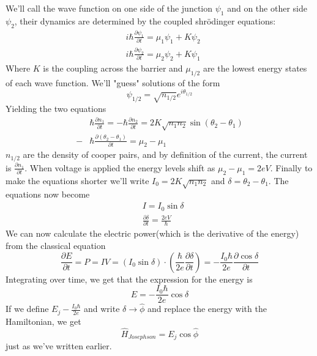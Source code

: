 \documentclass[english, a4paper, 12pt, twoside]{article}
\numberwithin{equation}{section} %
\begin{document}
We'll call the wave function on one side of the junction $\psi_1$ and on the other side $\psi_2$, their dynamics are determined by the coupled shr\"{o}dinger equations:
\begin{align*}
    &i\hbar\frac{\partial \psi_1}{\partial t} = \mu_1 \psi_1 + K \psi_2 \\
    &i\hbar\frac{\partial \psi_2}{\partial t} = \mu_2 \psi_2 + K \psi_1 
\end{align*}
Where $K$ is the coupling across the barrier and $\mu_{1/2}$ are the lowest energy states of each wave function. We'll "guess" solutions of the form
\[
    \psi_{1/2} = \sqrt{n_{1/2}}e^{i\theta_{1/2}}
\]
Yielding the two equations
\begin{align*}
    &\hbar \frac{\partial n_1}{\partial t} = - \hbar \frac{\partial n_2}{\partial t} = 2K \sqrt{n_1 n_2} \sin (\theta_2 - \theta_1) \\
    -&\hbar \frac{\partial (\theta_2 - \theta_1)}{\partial t} = \mu_2 - \mu_1
\end{align*}
$n_{1/2}$ are the density of cooper pairs, and by definition of the current, the current is $\frac{\partial n_1}{\partial t}$. When voltage is applied the energy levels shift as $\mu_2 - \mu_1 = 2eV$. Finally to make the equations shorter we'll write $I_0 = 2K\sqrt{n_1 n_2}$ and $\delta = \theta_2 - \theta_1$. The equations now become
\begin{align*}
    &I = I_0 \sin \delta \\
    &\frac{\partial \delta}{\partial t} = \frac{2eV}{\hbar}
\end{align*}
We can now calculate the electric power(which is the derivative of the energy) from the classical equation
\[
    \frac{\partial E}{\partial t} = P = I V = (I_0 \sin \delta) \cdot (\frac{\hbar}{2e} \frac{\partial \delta}{\partial t}) = -\frac{I_0 \hbar}{2e} \frac{\partial \cos \delta}{\partial t}
\]
Integrating over time, we get that the expression for the energy is
\[
    E = -\frac{I_0 \hbar}{2e} \cos \delta
\]
If we define $E_j -\frac{I_0 \hbar}{2e}$ and write $\delta \rightarrow \hat{\phi}$ and replace the energy with the Hamiltonian, we get
\[
    \hat{H}_{Josephson} = E_j \cos \hat{\phi}
\]
just as we've written earlier.
\end{document}
